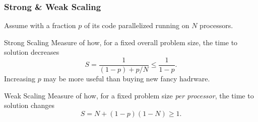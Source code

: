 
\begin{frame}
	\frametitle{Strong \& Weak Scaling}

	Assume with a fraction $p$ of its code parallelized running on $N$ processors.
	\begin{block}{Strong Scaling}
		Measure of how, for a fixed overall problem size, the time to solution decreases
		\begin{equation}\tag{Amdahl's Law}
			S = \frac{1}{(1-p) + p/N} \le \frac{1}{1-p}.
		\end{equation}
		Increasing $p$ may be more useful than buying new fancy hadrware.
	\end{block}

	\begin{block}{Weak Scaling}
		Measure of how, for a fixed problem size \emph{per processor}, the time to solution changes
		\begin{equation}\tag{Gustafson's Law}
			S = N + (1-p)(1-N) \ge 1.
		\end{equation}
	\end{block}
\end{frame}
